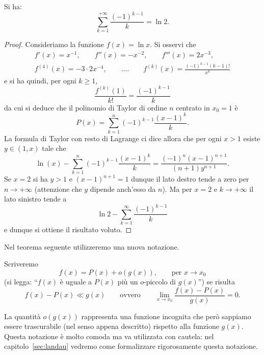 \begin{example}
Si ha:
  \[
    \sum_{k=1}^{+\infty} \frac{(-1)^{k-1}}{k} = \ln 2.
  \]
\end{example}
\begin{proof}
Consideriamo la funzione $f(x) = \ln x$.
Si osservi che
\begin{gather*}
  f'(x) = x^{-1},\qquad
  f''(x) = -x^{-2},\qquad
  f'''(x) = 2x^{-3}, \\
  f^{(4)}(x) = -3\cdot 2 x^{-4}, \qquad
  \dots. \qquad
  f^{(k)}(x) = \frac{(-1)^{k-1}(k-1)!}{x^k}
\end{gather*}
e si ha quindi, per ogni $k\ge 1$,
\[
  \frac{f^{(k)}(1)}{k!} = \frac{(-1)^{k-1}}{k}
\]
da cui si deduce che il polinomio di Taylor di ordine $n$
centrato in $x_0=1$ è
\[
P(x) = \sum_{k=1}^n (-1)^{k-1}\frac{(x-1)^k}{k}.
\]
La formula di Taylor con resto di Lagrange ci dice allora che per
ogni $x>1$ esiste $y\in(1,x)$ tale che
\[
  \ln(x) - \sum_{k=1}^n (-1)^{k-1}\frac{(x-1)^k}{k} 
  = \frac{(-1)^n(x-1)^{n+1}}{(n+1)y^{n+1}}.
\]
Se $x=2$ si ha $y>1$ e $(x-1)^{n+1}=1$ dunque
il lato destro tende a zero per $n\to +\infty$ 
(attenzione che $y$ dipende anch'esso da $n$). 
Ma per $x=2$ e $k\to +\infty$ il lato sinistro tende a 
\[
 \ln 2 - \sum_{k=1}^\infty \frac{(-1)^{k-1}}{k}
\]
e dunque si ottiene il risultato voluto.
\end{proof}

Nel teorema seguente utilizzeremo una nuova notazione. 
\begin{definition}
Scriveremo
%
%
\[
  f(x) = P(x) + o(g(x)), \qquad \text{per $x\to x_0$}
\]
(si legga: ``$f(x)$ è uguale a $P(x)$ più un $o$-piccolo di $g(x)$'')
se risulta
\[
  f(x) - P(x) \ll g(x)
  \qquad\text{ovvero}\qquad
  \lim_{x\to x_0} \frac{f(x)-P(x)}{g(x)} = 0.
\]
\end{definition}

La quantità $o(g(x))$ rappresenta una funzione incognita
che però sappiamo essere trascurabile (nel senso appena descritto)
rispetto alla funzione $g(x)$.
Questa notazione è molto comoda ma va utilizzata con cautela:
nel capitolo~\ref{sec:landau} vedremo come formalizzare rigorosamente 
questa notazione.


